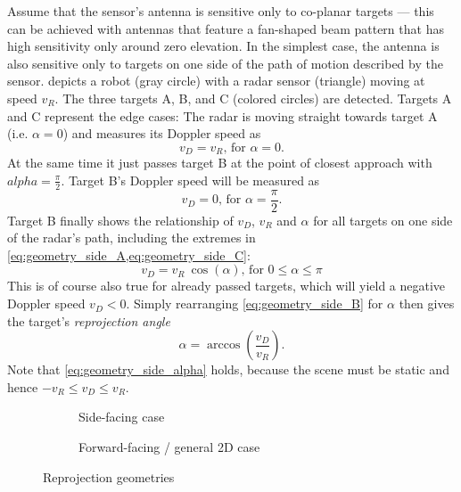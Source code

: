 Assume that the sensor's antenna is sensitive only to co-planar targets --- this can be achieved with antennas that feature a fan-shaped beam pattern that has high sensitivity only around zero elevation. In the simplest case, the antenna is also sensitive only to targets on one side of the path of motion described by the sensor.  depicts a robot (gray circle) with a radar sensor (triangle) moving at speed $v_R$. The three targets A, B, and C (colored circles) are detected. Targets A and C represent the edge cases: The radar is moving straight towards target A (i.e. $\alpha=0$) and measures its Doppler speed as
\begin{equation} \label{eq:geometry_side_A}
    v_D = v_R\text{, for }\alpha=0.
\end{equation}
At the same time it just passes target B at the point of closest approach with $alpha=\frac{\pi}{2}$. Target B's Doppler speed will be measured as
\begin{equation} \label{eq:geometry_side_C}
    v_D = 0\text{, for }\alpha=\frac{\pi}{2}.
\end{equation}
Target B finally shows the relationship of $v_D$, $v_R$ and $\alpha$ for all targets on one side of the radar's path, including the extremes in \cref{eq:geometry_side_A,eq:geometry_side_C}:
\begin{equation} \label{eq:geometry_side_B}
    v_D = v_R~\cos(\alpha)\text{, for }0 \leq \alpha \leq \pi
\end{equation}
This is of course also true for already passed targets, which will yield a negative Doppler speed $v_D < 0$. Simply rearranging \cref{eq:geometry_side_B} for $\alpha$ then gives the target's \textit{reprojection angle}
\begin{equation} \label{eq:geometry_side_alpha}
    \alpha = \arccos\left(\frac{v_D}{v_R}\right).
\end{equation}
Note that \cref{eq:geometry_side_alpha} holds, because the scene must be static and hence $-v_R \leq v_D \leq v_R$.

\begin{figure}[htp]
    \centering
    \footnotesize
    \begin{subfigure}[t]{0.475\textwidth}
        \def\svgwidth{\linewidth}
        
        \caption{Side-facing case}
        \label{fig:geometry-side}
    \end{subfigure}%
    \hfill%
    \begin{subfigure}[t]{0.475\textwidth}
        \def\svgwidth{\linewidth}
        
        \caption{Forward-facing / general 2D case}
        \label{fig:geometry-forward}
    \end{subfigure}
    \caption{Reprojection geometries}
\end{figure}

